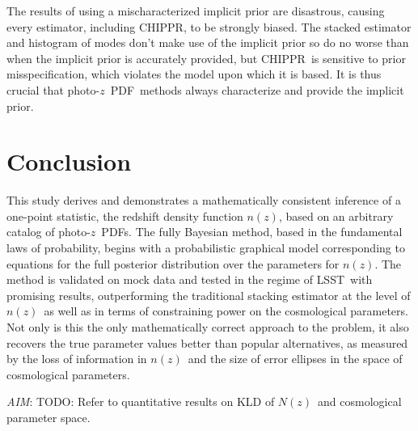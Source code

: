 \documentclass[iop]{emulateapj}
\newcommand{\todo}[3]{{\color{#2}\emph{#1}: #3}}
\newcommand{\aim}[1]{\todo{AIM}{red}{#1}}
\newcommand{\Tab}[1]{Table~\ref{#1}}
\newcommand{\project}[1]{\textsc{#1}}
\newcommand{\lsst}{\project{LSST}}
\newcommand{\Chippr}{\project{CHIPPR}}%
\newcommand{\repo}[1]{\texttt{#1}}
\newcommand{\chippr}{\repo{chippr}}
\newcommand{\pz}{photo-$z$}
\newcommand{\pzpdf}{\pz\ PDF}%
\newcommand{\nz}{$n(z)$}
\newcommand{\Nz}{$N(z)$}
\begin{document}
The results of using a mischaracterized implicit prior are disastrous, causing every estimator, including \Chippr, to be strongly biased.
The stacked estimator and histogram of modes don't make use of the implicit prior so do no worse than when the implicit prior is accurately provided, but \Chippr\ is sensitive to prior misspecification, which violates the model upon which it is based.
It is thus crucial that \pzpdf\ methods always characterize and provide the implicit prior.


\section{Conclusion}
\label{sec:con}

This study derives and demonstrates a mathematically consistent inference of a one-point statistic, the redshift density function \nz, based on an arbitrary catalog of \pzpdf s.  
The fully Bayesian method, based in the fundamental laws of probability, begins with a probabilistic graphical model corresponding to equations for the full posterior distribution over the parameters for \nz.  
The method is validated on mock data and tested in the regime of \lsst\ with promising results, outperforming the traditional stacking estimator at the level of \nz\ as well as in terms of constraining power on the cosmological parameters.
Not only is this the only mathematically correct approach to the problem, it also recovers the true parameter values better than popular alternatives, as measured by the loss of information in \nz\ and the size of error ellipses in the space of cosmological parameters.

\aim{TODO: Refer to quantitative results on KLD of \Nz\ and cosmological parameter space.}
\end{document}
